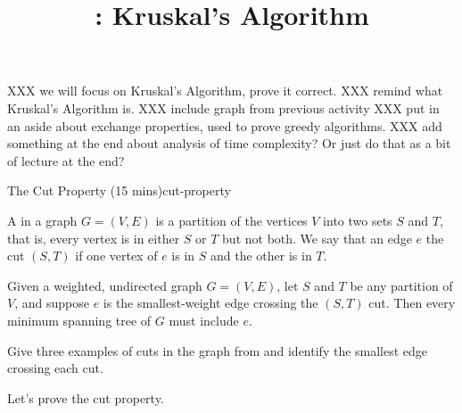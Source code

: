 \documentclass{tufte-handout}
\title{\thecourse: Kruskal's Algorithm}
\date{}
\begin{document}
\maketitle

XXX we will focus on Kruskal's Algorithm, prove it correct.
XXX remind what Kruskal's Algorithm is.
XXX include graph from previous activity
XXX put in an aside about exchange properties, used to prove greedy algorithms.
XXX add something at the end about analysis of time complexity?  Or
just do that as a bit of lecture at the end?

\begin{model*}{The Cut Property (15 mins)}{cut-property}
  \begin{defn}
    A  in a graph $G = (V,E)$ is a partition of the vertices
    $V$ into two sets $S$ and $T$, that is, every vertex is in either
    $S$ or $T$ but not both.  We say that an edge $e$ 
    the cut $(S,T)$ if one vertex of $e$ is in $S$ and the other is in
    $T$.
  \end{defn}

  \begin{thm}
    Given a weighted, undirected graph $G = (V,E)$, let $S$ and $T$ be
    any partition of $V$, and suppose $e$ is the smallest-weight edge
    crossing the $(S,T)$ cut.  Then every minimum spanning tree of $G$
    must include $e$.
  \end{thm}
\end{model*}

\begin{questions}
\item Give three examples of cuts in the graph from 
  and identify the smallest edge crossing each cut.
\end{questions}

Let's prove the cut property.
\end{document}
